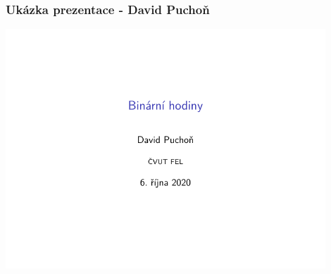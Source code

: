 \documentclass{beamer}
\begin{document}
	\begin{frame}
    \frametitle{Ukázka prezentace - David Puchoň}
		
		\includegraphics[page=4,width=0.9\textwidth]{pdf/KEO-David_Puchon-Prezentace.pdf}
	
	\end{frame}
\end{document}
